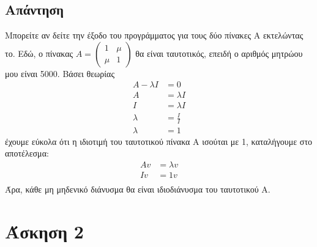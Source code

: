 \documentclass[a4paper,12pt]{article}
\begin{document}
\subsection{Απάντηση}
Μπορείτε αν δείτε την έξοδο του προγράμματος για τους δύο πίνακες Α
εκτελώντας το. Εδώ, ο πίνακας $
	A=\begin{pmatrix}
		1   & \mu \\
		\mu & 1
	\end{pmatrix}
$ θα είναι ταυτοτικός, επειδή ο αριθμός μητρώου μου είναι 5000. Βάσει θεωρίας
\begin{equation}
	\begin{split}
		A - \lambda I &= 0 \\
		A &= \lambda I \\
		I &= \lambda I \\
		\lambda & =\frac{I}{I} \\
		\lambda & =1
	\end{split}
\end{equation}
έχουμε εύκολα ότι η ιδιοτιμή του ταυτοτικού  πίνακα Α ισούται με 1,
καταλήγουμε στο αποτέλεσμα:
\begin{equation}
	\begin{split}
		A v &= \lambda v \\
		I v&= 1 v \\
	\end{split}
\end{equation}
Άρα, κάθε μη μηδενικό διάνυσμα θα είναι ιδιοδιάνυσμα του ταυτοτικού Α.
\newpage\section{Άσκηση 2}
\end{document}
